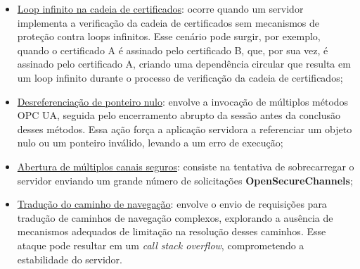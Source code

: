         \begin{itemize}
            \item[(-)] \underline{Loop infinito na cadeia de certificados}: ocorre quando um servidor implementa a verificação da cadeia de certificados sem mecanismos de proteção contra loops infinitos. Esse cenário pode surgir, por exemplo, quando o certificado A é assinado pelo certificado B, que, por sua vez, é assinado pelo certificado A, criando uma dependência circular que resulta em um loop infinito durante o processo de verificação da cadeia de certificados;
            \item[(3)] \underline{Desreferenciação de ponteiro nulo}: envolve a invocação de múltiplos métodos OPC UA, seguida pelo encerramento abrupto da sessão antes da conclusão desses métodos. Essa ação força a aplicação servidora a referenciar um objeto nulo ou um ponteiro inválido, levando a um erro de execução;
            \item[(6)] \underline{Abertura de múltiplos canais seguros}: consiste na tentativa de sobrecarregar o servidor enviando um grande número de solicitações \textbf{OpenSecureChannels};
            \item[(5)] \underline{Tradução do caminho de navegação}: envolve o envio de requisições para tradução de caminhos de navegação complexos, explorando a ausência de mecanismos adequados de limitação na resolução desses caminhos. Esse ataque pode resultar em um \textit{call stack overflow}, comprometendo a estabilidade do servidor.

\end{itemize}

